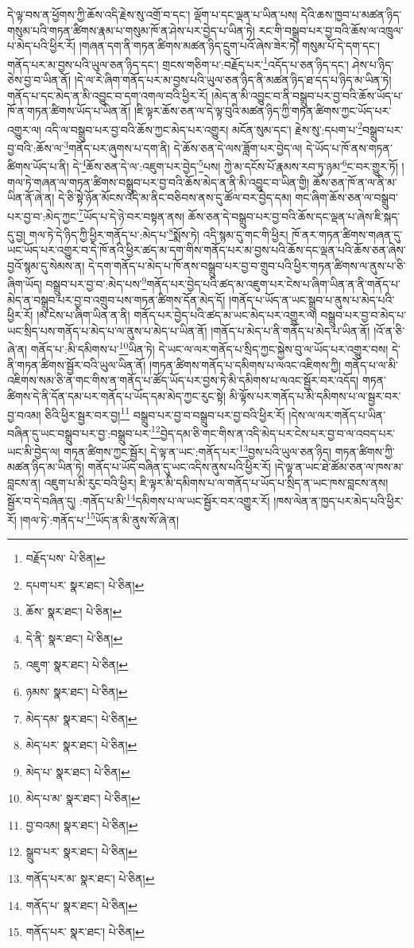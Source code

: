 དེ་ལྟ་བས་ན་ཕྱོགས་ཀྱི་ཆོས་འདི་རྗེས་སུ་འགྲོ་བ་དང་། ལྡོག་པ་དང་ལྡན་པ་ཡིན་པས། དེའི་ཆས་ཁྱབ་པ་མཚན་ཉིད་གསུམ་པའི་གཏན་ཚིགས་རྣམ་པ་གསུམ་ཁོ་ན་ཤེས་པར་བྱེད་པ་ཡིན་ཏེ། རང་གི་བསྒྲུབ་པར་བྱ་བའི་ཆོས་ལ་འཁྲུལ་པ་མེད་པའི་ཕྱིར་རོ། །གཞན་དག་ནི་གཏན་ཚིགས་མཚན་ཉིད་དྲུག་པའོ་ཞེས་ཟེར་ཏེ། གསུམ་པོ་དེ་དག་དང་། གནོད་པར་མ་བྱས་པའི་ཡུལ་ཅན་ཉིད་དང་། གྲངས་གཅིག་པ་:བརྗོད་པར་\footnote{བརྗོད་པས་  པེ་ཅིན། }འདོད་པ་ཅན་ཉིད་དང་། ཤེས་པ་ཉིད་ཅེས་བྱ་བ་ཡིན་ནོ། །དེ་ལ་རེ་ཞིག་གནོད་པར་མ་བྱས་པའི་ཡུལ་ཅན་ཉིད་ནི་མཚན་ཉིད་ཐ་དད་པ་ཉིད་མ་ཡིན་ཏེ། གནོད་པ་དང་མེད་ན་མི་འབྱུང་བ་དག་འགལ་བའི་ཕྱིར་རོ། །མེད་ན་མི་འབྱུང་བ་ནི་བསྒྲུབ་པར་བྱ་བའི་ཆོས་ཡོད་པ་ཁོ་ན་གཏན་ཚིགས་ཡོད་པ་ཡིན་ནོ། །ཇི་ལྟར་ཆོས་ཅན་ལ་དེ་ལྟ་བུའི་མཚན་ཉིད་ཀྱི་གཏན་ཚིགས་ཀྱང་ཡོད་པར་འགྱུར་ལ། འདི་ལ་བསྒྲུབ་པར་བྱ་བའི་ཆོས་ཀྱང་མེད་པར་འགྱུར། མངོན་སུམ་དང་། རྗེས་སུ་:དཔག་པ་\footnote{དཔག་པར་  སྣར་ཐང་།  པེ་ཅིན། }བསྒྲུབ་པར་བྱ་བའི་:ཆོས་ལ་\footnote{ཆོས་  སྣར་ཐང་།  པེ་ཅིན། }གནོད་པར་ཞུགས་པ་དག་ནི། དེ་ཆོས་ཅན་དེ་ལས་ཟློག་པར་བྱེད་ལ། དེ་ཡོད་པ་ཁོ་ནས་གཏན་ཚིགས་ཡོད་པ་ནི། དེ་\footnote{དེ་ནི་  སྣར་ཐང་།  པེ་ཅིན། }ཆོས་ཅན་དེ་ལ་:འཇུག་པར་བྱེད་\footnote{འཇུག་  སྣར་ཐང་།  པེ་ཅིན། }པས། ཀྱེ་མ་དངོས་པོ་རྣམས་རབ་ཏུ་ཉམ་\footnote{ཉམས་  སྣར་ཐང་།  པེ་ཅིན། }ང་བར་གྱུར་ཏོ། །གལ་ཏེ་གཞན་ལ་གཏན་ཚིགས་བསྒྲུབ་པར་བྱ་བའི་ཆོས་མེད་ན་ནི་མི་འབྱུང་བ་ཡིན་གྱི། ཆོས་ཅན་ཁོ་ན་ལ་ནི་མ་ཡིན་ནོ་ཞེ་ན། དེ་ཅི་སྟེ་ཉོན་མོངས་འདི་མ་ནིང་བཅིབས་ནས་དུ་ཚོལ་བར་བྱེད་དམ། གང་ཞིག་ཆོས་ཅན་ལ་བསྒྲུབ་པར་བྱ་བ་:མེད་ཀྱང་\footnote{མེད་དམ་  སྣར་ཐང་།  པེ་ཅིན། }ཡོད་པ་དེ་ཉེ་བར་བསྟན་ནས། ཆོས་ཅན་དེ་བསྒྲུབ་པར་བྱ་བའི་ཆོས་དང་ལྡན་པ་ཞེས་ཇི་སྐད་དུ་བྱ། གལ་ཏེ་དེ་ཉིད་ཀྱི་ཕྱིར་གནོད་པ་:མེད་པ་\footnote{མེད་པར་  སྣར་ཐང་།  པེ་ཅིན། }སྨོས་ཏེ། འདི་སྙམ་དུ་གང་གི་ཕྱིར། ཁོ་ནར་གཏན་ཚིགས་གཞན་དུ་ཡང་ཡོད་པར་འགྱུར་བ་དེ་ཁོ་ནའི་ཕྱིར་ཚད་མ་དག་གིས་གནོད་པར་མ་བྱས་པའི་ཆོས་དང་ལྡན་པའི་ཆོས་ཅན་ཞེས་བྱའོ་སྙམ་དུ་སེམས་ན། དེ་དག་གནོད་པ་མེད་པ་ཁོ་ནས་བསྒྲུབ་པར་བྱ་བ་གྲུབ་པའི་ཕྱིར་གཏན་ཚིགས་ལ་ནུས་པ་ཅི་ཞིག་ཡོད། བསྒྲུབ་པར་བྱ་བ་:མེད་པས་\footnote{མེད་པ་  སྣར་ཐང་།  པེ་ཅིན། }གནོད་པར་བྱེད་པའི་ཚད་མ་འཇུག་པར་ངེས་པ་ཞིག་ཡིན་ན་ནི་གནོད་པ་མེད་ན་བསྒྲུབ་པར་བྱ་བ་འགྲུབ་པས་གཏན་ཚིགས་དོན་མེད་དོ། །གནོད་པ་ཡོད་ན་ཡང་སྒྲུབ་པ་ནུས་པ་མེད་པའི་ཕྱིར་རོ། །མ་ངེས་པ་ཞིག་ཡིན་ན་ནི། གནོད་པར་བྱེད་པའི་ཚད་མ་ཡང་མེད་པར་འགྱུར་ལ། བསྒྲུབ་པར་བྱ་བ་མེད་པ་ཡང་སྲིད་པས་གནོད་པ་མེད་པ་ལ་ནུས་པ་མེད་པ་ཡིན་ནོ། །གནོད་པ་མེད་པ་ནི་གནོད་པ་མེད་པ་ཡིན་ནོ། །འོ་ན་ཅི་ཞེ་ན། གནོད་པ་:མི་དམིགས་པ་\footnote{མེད་པ་མ་  སྣར་ཐང་།  པེ་ཅིན། }ཡིན་ཏེ། དེ་ཡང་ལ་ལར་གནོད་པ་སྲིད་ཀྱང་སྐྱེས་བུ་ལ་ཡོད་པར་འགྱུར་བས། དེ་ནི་གཏན་ཚིགས་སྦྱོར་བའི་ཡུལ་ཡིན་ནོ། །གཏན་ཚིགས་གནོད་པ་དམིགས་པ་ལའང་འཇིགས་ཀྱི། གནོད་པ་ལ་མི་འཇིགས་སམ་ཅི་ན་གང་གིས་ན་གནོད་པ་ཚོད་ཡོད་པར་བྱས་ཏེ་མི་དམིགས་པ་ལའང་སྦྱོར་བར་འདོད། གཏན་ཚིགས་དེ་ནི་དོན་དམ་པར་གནོད་པ་ཡོད་དམ་མེད་ཀྱང་རུང་སྟེ། མི་ལྟོས་པར་གནོད་པ་མི་དམིགས་པ་ལ་སྦྱར་བར་བྱ་བའམ། ཅིའི་ཕྱིར་སྦྱར་བར་བྱ།\footnote{བྱ་བའམ།  སྣར་ཐང་།  པེ་ཅིན། } བསྒྲུབ་པར་བྱ་བ་བསྒྲུབ་པར་བྱ་བའི་ཕྱིར་རོ། །དེས་ལ་ལར་གནོད་པ་ཡིན་བཞིན་དུ་ཡང་བསྒྲུབ་པར་བྱ་:བསྒྲུབ་པར་\footnote{སྒྲུབ་པར་  སྣར་ཐང་།  པེ་ཅིན། }བྱེད་དམ་ཅི་གང་གིས་ན་འདི་མེད་པར་ངེས་པར་བྱ་བ་ལ་འབད་པར་ཡང་མི་བྱེད་ལ། གཏན་ཚིགས་ཀྱང་སྦྱོར། དེ་ལྟ་ན་ཡང་:གནོད་པར་\footnote{གནོད་པར་མ་  སྣར་ཐང་།  པེ་ཅིན། }བྱས་པའི་ཡུལ་ཅན་ཉིད། གཏན་ཚིགས་ཀྱི་མཚན་ཉིད་མ་ཡིན་ཏེ། གནོད་པ་ཡོད་བཞིན་དུ་ཡང་འདིས་ནུས་པའི་ཕྱིར་རོ། །དེ་ལྟ་ན་ཡང་ཐེ་ཚོམ་ཅན་ལ་ཁས་མ་བླངས་ན། འཇུག་པ་མི་རུང་བའི་ཕྱིར། ཇི་ལྟར་མི་དམིགས་པ་ལ་གནོད་པ་ཡོད་པ་སྲིད་ན་ཡང་ཁས་བླངས་ནས། སྦྱོར་བ་དེ་བཞིན་དུ། :གནོད་པ་མི་\footnote{གནོད་པ་  སྣར་ཐང་།  པེ་ཅིན། }དམིགས་པ་ལ་ཡང་སྦྱོར་བར་འགྱུར་རོ། །ཁས་ལེན་ན་ཁྱད་པར་མེད་པའི་ཕྱིར་རོ། །གལ་ཏེ་:གནོད་པ་\footnote{གནོད་པར་  སྣར་ཐང་།  པེ་ཅིན། }ཡོད་ན་མི་ནུས་སོ་ཞེ་ན། 
